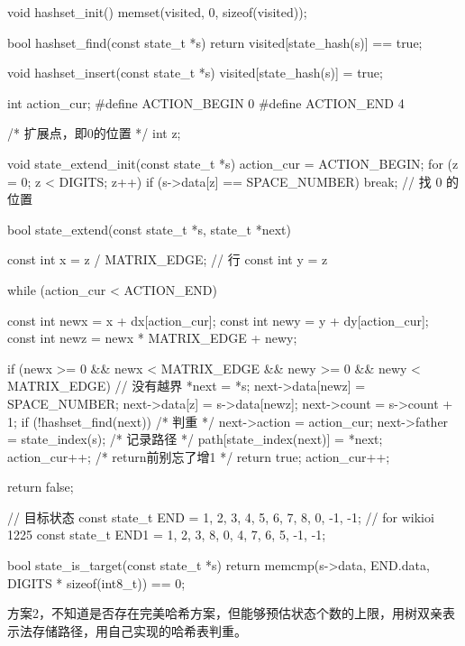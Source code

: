 \begin{Codex}[label=eight_digits_bfs.c]
void hashset_init() {
    memset(visited, 0, sizeof(visited));
}

bool hashset_find(const state_t *s) {
    return visited[state_hash(s)] == true;
}

void hashset_insert(const state_t *s) {
    visited[state_hash(s)] = true;
}

int action_cur;
#define ACTION_BEGIN 0
#define ACTION_END 4

/* 扩展点，即0的位置 */
int z;

void state_extend_init(const state_t *s) {
    action_cur = ACTION_BEGIN;
    for (z = 0; z < DIGITS; z++) {
        if (s->data[z] == SPACE_NUMBER) {
            break;  // 找 0 的位置
        }
    }
}

bool state_extend(const state_t *s, state_t *next) {
    const int x = z / MATRIX_EDGE; // 行
    const int y = z %

    while (action_cur < ACTION_END) {
        const int newx = x + dx[action_cur];
        const int newy = y + dy[action_cur];
        const int newz = newx * MATRIX_EDGE + newy;

        if (newx >= 0 && newx < MATRIX_EDGE && newy >= 0 &&
                newy < MATRIX_EDGE) { // 没有越界
            *next = *s;
            next->data[newz] = SPACE_NUMBER;
            next->data[z] = s->data[newz];
            next->count = s->count + 1;
            if (!hashset_find(next)) { /* 判重 */
                next->action = action_cur;
                next->father = state_index(s);
                /* 记录路径 */
                path[state_index(next)] = *next;
                action_cur++; /* return前别忘了增1 */
                return true;
            }
        }
        action_cur++;
    }
    return false;
}

// 目标状态
const state_t END = {{1, 2, 3, 4, 5, 6, 7, 8, 0}, -1, -1};
// for wikioi 1225
const state_t END1 = {{1, 2, 3, 8, 0, 4, 7, 6, 5}, -1, -1};

bool state_is_target(const state_t *s) {
    return memcmp(s->data, END.data, DIGITS * sizeof(int8_t)) == 0;
}
\end{Codex}

方案2，不知道是否存在完美哈希方案，但能够预估状态个数的上限，用树双亲表示法存储路径，用自己实现的哈希表判重。

